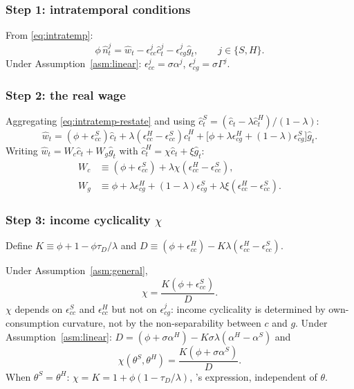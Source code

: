 \subsubsection{Step 1: intratemporal conditions}
From \eqref{eq:intratemp}:
\begin{equation}\label{eq:intratemp-restate}
  \phi\,\hat n^{j}_{t}=\hat w_{t}-\epsilon^{j}_{cc}\hat c^{j}_{t}
  -\epsilon^{j}_{cg}\hat g_{t},\qquad j\in\{S,H\}.
\end{equation}
Under Assumption~\ref{asm:linear}: $\epsilon^{j}_{cc}=\sigma\alpha^{j}$,
$\epsilon^{j}_{cg}=\sigma\Gamma^{j}$.

\subsubsection{Step 2: the real wage}
Aggregating \eqref{eq:intratemp-restate} and using
$\hat c^{S}_{t}=(\hat c_{t}-\lambda\hat c^{H}_{t})/(1-\lambda)$:
\begin{equation}\label{eq:wage-1}
  \hat w_{t}=(\phi+\epsilon^{S}_{cc})\hat c_{t}
    +\lambda(\epsilon^{H}_{cc}-\epsilon^{S}_{cc})\hat c^{H}_{t}
    +\bigl[\phi+\lambda\epsilon^{H}_{cg}+(1-\lambda)\epsilon^{S}_{cg}\bigr]\hat g_{t}.
\end{equation}
Writing $\hat w_{t}=W_{c}\hat c_{t}+W_{g}\hat g_{t}$ with
$\hat c^{H}_{t}=\chi\hat c_{t}+\xi\hat g_{t}$:
\begin{align}
  W_{c}&\equiv(\phi+\epsilon^{S}_{cc})+\lambda\chi(\epsilon^{H}_{cc}-\epsilon^{S}_{cc}),
    \label{eq:Wc}\\
  W_{g}&\equiv\phi+\lambda\epsilon^{H}_{cg}+(1-\lambda)\epsilon^{S}_{cg}
    +\lambda\xi(\epsilon^{H}_{cc}-\epsilon^{S}_{cc}).\label{eq:Wg}
\end{align}

\subsubsection{Step 3: income cyclicality \texorpdfstring{$\chi$}{chi}}
Define $K\equiv\phi+1-\phi\tau_{D}/\lambda$ and
$D\equiv(\phi+\epsilon^{H}_{cc})-K\lambda(\epsilon^{H}_{cc}-\epsilon^{S}_{cc})$.

\begin{proposition}\label{prop:chi-general}
Under Assumption~\ref{asm:general},
\begin{equation}\label{eq:chi-general}
  \chi=\frac{K(\phi+\epsilon^{S}_{cc})}{D}.
\end{equation}
$\chi$ depends on $\epsilon^{S}_{cc}$ and $\epsilon^{H}_{cc}$ but not on
$\epsilon^{j}_{cg}$: income cyclicality is determined by own-consumption
curvature, not by the non-separability between $c$ and $g$.
Under Assumption~\ref{asm:linear}:
$D=(\phi+\sigma\alpha^{H})-K\sigma\lambda(\alpha^{H}-\alpha^{S})$ and
\begin{equation}\label{eq:chi-linear}
  \chi(\theta^{S},\theta^{H})=\frac{K(\phi+\sigma\alpha^{S})}{D}.
\end{equation}
When $\theta^{S}=\theta^{H}$: $\chi=K=1+\phi(1-\tau_{D}/\lambda)$, \bilbiie{}'s
expression, independent of $\theta$.
\end{proposition}


